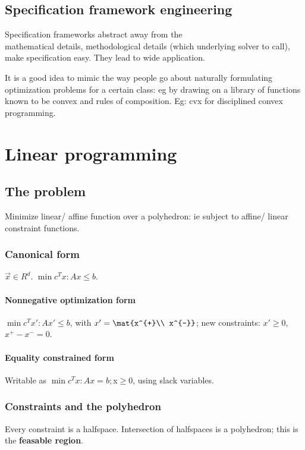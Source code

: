 \documentclass[oneside, article]{memoir}
\begin{document}
\chapter{Specification framework engineering}
Specification frameworks abstract away from the \\
mathematical details, methodological details (which underlying solver to call), make specification easy. They lead to wide application.

It is a good idea to mimic the way people go about naturally formulating optimization problems for a certain class: eg by drawing on a library of functions known to be convex and rules of composition. Eg: cvx for disciplined convex programming.

\part{Linear programming}
\chapter{The problem}
Minimize linear/ affine function over a polyhedron: ie subject to affine/ linear constraint functions.

\section{Canonical form}
$\vec{x} \in R^{d}$. $\min c^{T}x: Ax \leq b$.

\subsection{Nonnegative optimization form}
$\min c^{T}x': Ax' \leq b$, with $x' = \mat{x^{+}\\ x^{-}}$; new constraints: $x' \geq 0$, $x^{+} - x^{-} = 0$.

\subsection{Equality constrained form}
Writable as $\min c^{T}x: Ax = b; $x$ \geq 0$, using slack variables.

\section{Constraints and the polyhedron}
Every constraint is a halfspace. Intersection of halfspaces is a polyhedron; this is the \textbf{feasable region}.
\end{document}
